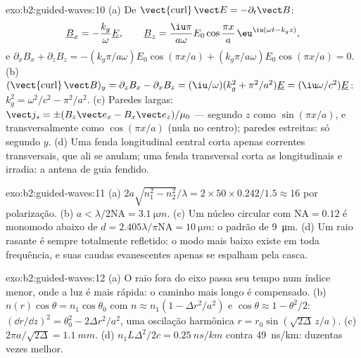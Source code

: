 \begin{solution}{exo:b2:guided-waves:10}
(a) De $\operatorname{\vect{curl}}\vect E = -\partial_t\vect B$:
\[
\underline B_x = -\frac{k_g}\omega\underline E , \qquad
\underline B_z = \frac{\iu\pi}{a\omega}E_0\cos\frac{\pi x}a\,\eu^{\iu(\omega t - k_gz)} ,
\]
e $\partial_xB_x + \partial_zB_z = -(k_g\pi/a\omega)E_0\cos(\pi x/a) + (k_g\pi/a\omega)E_0
\cos(\pi x/a) = 0$. (b) $(\operatorname{\vect{curl}}\vect B)_y = \partial_zB_x - \partial_xB_z =
(\iu/\omega)(k_g^2 + \pi^2/a^2)\underline E = (\iu\omega/c^2)\underline E$: $k_g^2 = \omega^2/c^2 - \pi^2/a^2$.
(c) Paredes largas: $\vect j_s = \pm(B_z\vect e_x - B_x\vect e_z)/\mu_0$ --- segundo $z$
como $\sin(\pi x/a)$, e transversalmente como $\cos(\pi x/a)$ (nula no centro); paredes
estreitas: só segundo $y$. (d) Uma fenda longitudinal central corta apenas
correntes transversais, que ali se anulam; uma fenda transversal corta as
longitudinais e irradia: a antena de guia fendido.
\end{solution}

\begin{solution}{exo:b2:guided-waves:11}
(a) $2a\sqrt{n_1^2 - n_2^2}/\lambda = 2 \times 50 \times 0.242/1.5 \approx 16$ por polarização.
(b) $a < \lambda/2\mathrm{NA} = \qty{3.1}{\micro m}$. (c) Um núcleo circular com $\mathrm{NA} =
0.12$ é monomodo abaixo de $d = 2.405\lambda/\pi\mathrm{NA} = \qty{10}{\micro m}$: o
padrão de \qty{9}{\micro m}. (d) Um raio rasante é sempre totalmente refletido: o
modo mais baixo existe em toda frequência, e suas caudas evanescentes apenas
se espalham pela casca.
\end{solution}

\begin{solution}{exo:b2:guided-waves:12}
(a) O raio fora do eixo passa seu tempo num índice menor, onde a luz é
mais rápida: o caminho mais longo é compensado. (b) $n(r)\cos\theta = n_1\cos\theta_0$
com $n \approx n_1(1 - \Delta r^2/a^2)$ e $\cos\theta \approx 1 - \theta^2/2$: $(\dd r/\dd z)^2 =
\theta_0^2 - 2\Delta r^2/a^2$, uma oscilação harmônica $r = r_0\sin(\sqrt{2\Delta}\,z/a)$.
(c) $2\pi a/\sqrt{2\Delta} = \qty{1.1}{mm}$. (d) $n_1L\Delta^2/2c = \qty{0.25}{ns/km}$ contra
\qty{49}{ns/km}: duzentas vezes melhor.
\end{solution}

